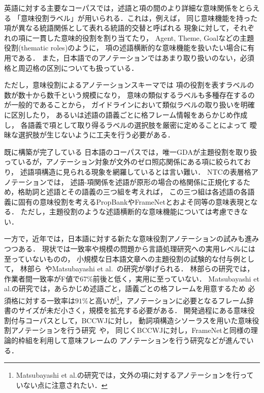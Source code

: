 \documentclass[japanese]{jnlp_1.4}
\begin{document}
英語に対する主要なコーパスでは，述語と項の間のより詳細な意味関係をとらえる
「意味役割ラベル」が用いられる．これは，例えば，
同じ意味機能を持った項が異なる統語関係として表れる統語的交替と呼ばれる
現象に対して，それぞれの項に一貫した意味的役割を割り当てたり，
Agent, Theme, Goalなどの主題役割(thematic roles)のように，
項の述語横断的な意味機能を扱いたい場合に有用である．
また，日本語でのアノテーションではあまり取り扱いのない，必須格と周辺格の区別についても扱っている．

ただし，意味役割によるアノテーションスキーマでは
項の役割を表すラベルの数が数十から数千という規模になり，
意味の類似するラベルも多種存在するのが一般的であることから，
ガイドラインにおいて類似ラベルの取り扱いを明確に区別したり，
あるいは述語の語義ごとに格フレーム情報をあらかじめ作成し，
各語義で項として取り得るラベルの選択肢を厳密に定めることによって
曖昧な選択肢が生じないように工夫を行う必要がある．

既に構築が完了している
日本語のコーパスでは，唯一GDAが主題役割を取り扱っているが，アノテーション対象が文外のゼロ照応関係にある項に絞られており，
述語項構造に見られる現象を網羅しているとは言い難い．
NTCの表層格アノテーションでは，
述語-項関係を述語が原形の場合の格関係に正規化するため，格助詞と述語とその語義の三つ組を考えれば，
この三つ組は各述語の各語義に固有の意味役割を考えるPropBankやFrameNetとおよそ同等の意味表現となる．
ただし，主題役割のような述語横断的な意味機能については考慮できない．

一方で，近年では，日本語に対する新たな意味役割アノテーションの試みも進みつつある．
現状では一致率や規模の問題から言語処理研究への実用レベルには至っていないものの，
小規模な日本語文章への主題役割の試験的な付与例として，
林部ら~\cite{hayashibe2012}やMatsubayashi et al.~\cite{MATSUBAYASHI12.941}の研究が挙げられる．
林部らの研究では，作業者間一致率がF値で67\%前後と低く，実用に至っていない．
Matsubayashi et al.の研究では，あらかじめ述語ごと，語義ごとの格フレームを用意するため
必須格に対する一致率は$91\%$と高いが\footnote{Matsubayashi et al.の研究では，文外の項に対するアノテーションを行っていない点に注意されたい．}，アノテーションに必要となるフレーム辞書のサイズが未だ小さく，規模を拡充する必要がある．
開発過程にある意味役割付与コーパスとして，BCCWJに対し，
動詞項構造シソーラスを用いた意味役割アノテーションを行う研究~\cite{takeuchi2013}や，
同じくBCCWJに対し，FrameNetと同様の理論的枠組を利用して意味フレームの
アノテーションを行う研究\cite{ohara2013}などが進んでいる．
\end{document}

